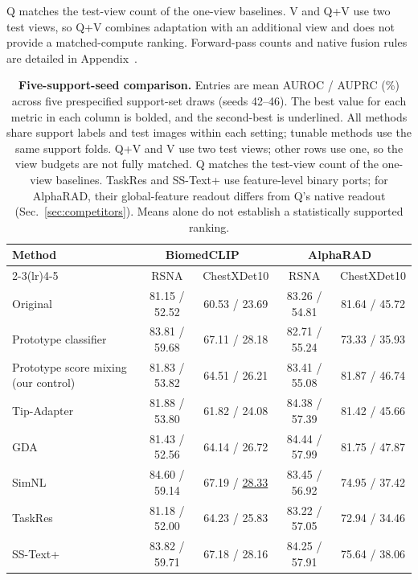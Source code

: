 \documentclass[10pt,twocolumn,letterpaper]{article}
\begin{document}
Q matches the test-view count of the one-view baselines. V and Q+V use two test views, so Q+V combines adaptation with an additional view and does not provide a matched-compute ranking. Forward-pass counts and native fusion rules are detailed in Appendix~.

\begin{table}[t]
\centering
\caption{\textbf{Five-support-seed comparison.} Entries are mean AUROC / AUPRC (\%) across five prespecified support-set draws (seeds 42--46). The best value for each metric in each column is bolded, and the second-best is underlined. All methods share support labels and test images within each setting; tunable methods use the same support folds. Q+V and V use two test views; other rows use one, so the view budgets are not fully matched. Q matches the test-view count of the one-view baselines. TaskRes and SS-Text+ use feature-level binary ports; for AlphaRAD, their global-feature readout differs from Q's native readout (Sec.~\ref{sec:competitors}). Means alone do not establish a statistically supported ranking.}
\label{tab:competitors}
\small
\begin{tabular*}{\textwidth}{@{\extracolsep{\fill}}lcccc}
\toprule
Method & \multicolumn{2}{c}{BiomedCLIP~\cite{biomedclip}} & \multicolumn{2}{c}{AlphaRAD~\cite{alpharad}} \\
\cmidrule(lr){2-3}\cmidrule(lr){4-5}
 & RSNA & ChestXDet10 & RSNA & ChestXDet10 \\
\midrule
Original & 81.15 / 52.52 & 60.53 / 23.69 & 83.26 / 54.81 & 81.64 / 45.72 \\
Prototype classifier~\cite{snell2017prototypical} & 83.81 / 59.68 & 67.11 / 28.18 & 82.71 / 55.24 & 73.33 / 35.93 \\
Prototype score mixing (our control) & 81.83 / 53.82 & 64.51 / 26.21 & 83.41 / 55.08 & 81.87 / 46.74 \\
Tip-Adapter~\cite{tipadapter} & 81.88 / 53.80 & 61.82 / 24.08 & 84.38 / 57.39 & 81.42 / 45.66 \\
GDA~\cite{gda} & 81.43 / 52.56 & 64.14 / 26.72 & 84.44 / 57.99 & 81.75 / 47.87 \\
SimNL~\cite{simnl} & 84.60 / 59.14 & 67.19 / \underline{28.33} & 83.45 / 56.92 & 74.95 / 37.42 \\
TaskRes~\cite{taskres} & 81.18 / 52.00 & 64.23 / 25.83 & 83.22 / 57.05 & 72.94 / 34.46 \\
SS-Text+~\cite{sstextplus} & 83.82 / 59.71 & 67.18 / 28.16 & 84.25 / 57.91 & 75.64 / 38.06 \\

\end{tabular*}
\end{table}
\end{document}
